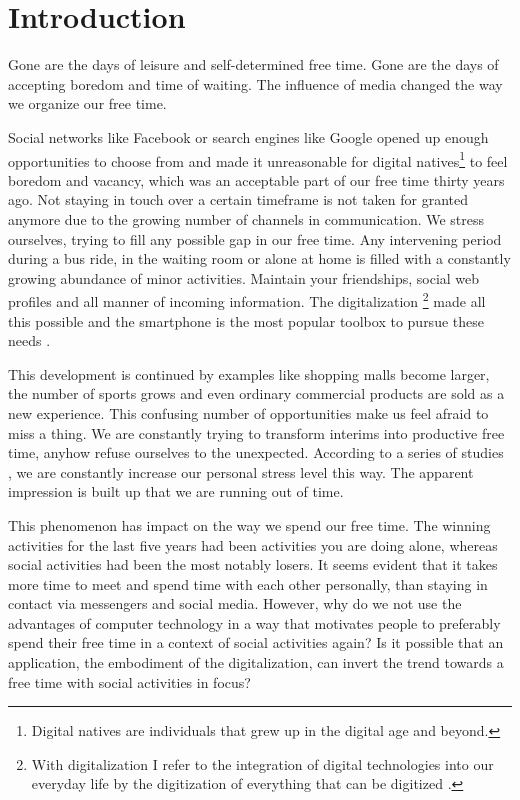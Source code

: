 \documentclass[12pt,numbers=noenddot,parskip,bibliography=totocnumbered,listof=totocnumbered,draft]{scrreprt}
\begin{document}
\chapter{Introduction}
Gone are the days of leisure and self-determined free time. Gone are the days of accepting boredom and time of waiting. The influence of media changed the way we organize our free time.

Social networks like Facebook or search engines like Google opened up enough opportunities to choose from and made it unreasonable for digital natives\footnote{Digital natives are individuals that grew up in the digital age and beyond.} to feel boredom and vacancy, which was an acceptable part of our free time thirty years ago. Not staying in touch over a certain timeframe is not taken for granted anymore due to the growing number of channels in communication. We stress ourselves, trying to fill any possible gap in our free time. Any intervening period during a bus ride, in the waiting room or alone at home is filled with a constantly growing abundance of minor activities. Maintain your friendships, social web profiles and all manner of incoming information. The digitalization \footnote{With digitalization I refer to the integration of digital technologies into our everyday life by the digitization of everything that can be digitized \citep{digitalization}.} made all this possible and the smartphone is the most popular toolbox to pursue these needs \citep[p.213]{destatis2017}.

This development is continued by examples like shopping malls become larger, the number of sports grows and even ordinary commercial products are sold as a new experience. This confusing number of opportunities make us feel afraid to miss a thing. We are constantly trying to transform interims into productive free time, anyhow refuse ourselves to the unexpected. According to a series of studies \citep[p. 14]{freizeitmonitor2016}, we are constantly increase our personal stress level this way. The apparent impression is built up that we are running out of time.

This phenomenon has impact on the way we spend our free time. The winning activities for the last five years had been activities you are doing alone, whereas social activities had been the most notably losers. It seems evident that it takes more time to meet and spend time with each other personally, than staying in contact via messengers and social media. However, why do we not use the advantages of computer technology in a way that motivates people to preferably spend their free time in a context of social activities again? Is it possible that an application, the embodiment of the digitalization, can invert the trend towards a free time with social activities in focus?
\end{document}
